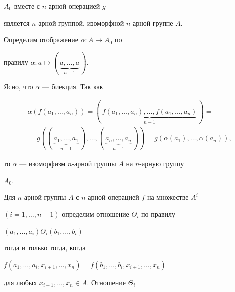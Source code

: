 \begin{prop}


$A_0$ вместе с $n$-арной операцией $g$


является $n$-арной группой, изоморфной $n$-арной группе $A$.


\end{prop}





\begin{pf}


Определим отображение $\alpha: A\to A_0$ по


правилу $\alpha:a\mapsto (\,\underbrace{a,\dotsc,a}_{n-1}\,)$.


Ясно, что $\alpha$ --- биекция. Так как


\begin{multline*}


\alpha(f(a_1,\dotsc,a_n))=


(\,\underbrace{f(a_1,\dotsc,a_n),\dotsc,f(a_1,\dotsc,a_n)}_{n-1}\,)= \\


%


=g((\,\underbrace{a_1,\dotsc,a_1}_{n-1}\,),\dotsc,


(\,\underbrace{a_n,\dotsc,a_n}_{n-1}\,))=


g(\alpha(a_1),\dotsc,\alpha(a_n)),


\end{multline*}


то $\alpha$ --- изоморфизм $n$-арной группы $A$ на $n$-арную группу


$A_0$.


\end{pf}





Для $n$-арной группы $A$ с $n$-арной операцией $f$ на множестве $A^i$


$(i = 1,\dotsc, n-1)$ определим отношение $\Theta_i$ по правилу


$(a_1,...,a_i)\Theta_i(b_1,...,b_i)$




тогда и только тогда, когда


$f(a_1,...,a_i,x_{i+1},...,x_n)=f(b_1,\dotsc,b_i,x_{i+1},\dotsc,x_n)$




для любых $x_{i+1},\dotsc, x_n \in A$. Отношение $\Theta_i$


